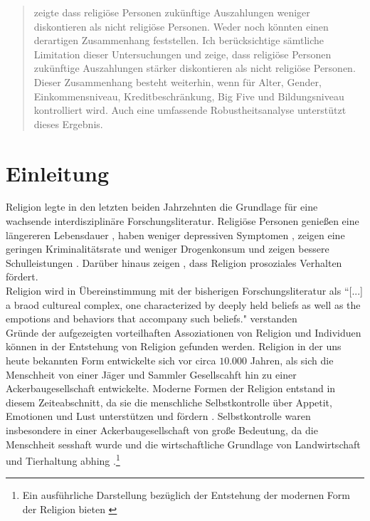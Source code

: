 \documentclass[11pt,a4paper]{article}
\begin{document}

\newpage
\tableofcontents
\listoffigures
\listoftables
\newpage
\begin{abstract}
\textcite{carter2012religious} zeigte dass religiöse Personen zukünftige Auszahlungen weniger diskontieren als nicht religiöse Personen. Weder \textcite{benjamin2013religious} noch \textcite{thornton2015divine} könnten einen derartigen Zusammenhang feststellen. Ich berücksichtige sämtliche Limitation dieser Untersuchungen und zeige, dass religiöse Personen zukünftige Auszahlungen stärker diskontieren als nicht religiöse Personen. Dieser Zusammenhang besteht weiterhin, wenn für Alter, Gender, Einkommensniveau, Kreditbeschränkung, Big Five und Bildungsniveau kontrolliert wird. Auch eine umfassende Robustheitsanalyse unterstützt dieses Ergebnis. 
\end{abstract}

\section{Einleitung}

Religion legte in den letzten beiden Jahrzehnten die Grundlage für eine  wachsende interdisziplinäre Forschungsliteratur. Religiöse Personen genießen eine längereren Lebensdauer \parencite{mccullough2000religious}, haben weniger depressiven Symptomen \parencite{smith2003religiousness}, zeigen eine geringen  Kriminalitätsrate und weniger Drogenkonsum \parencite{baier2001if} und zeigen bessere Schulleistungen \parencite{jeynes2002meta}. Darüber hinaus zeigen \textcite{norenzayan2008origin}, dass Religion prosoziales Verhalten fördert.\\
Religion wird in Übereinstimmung mit der bisherigen Forschungsliteratur als  “[...] a braod cultureal complex, one characterized by deeply held beliefs as well as the empotions and behaviors that accompany such beliefs." verstanden \parencite{mccullough2013religion}\\

Gründe der aufgezeigten vorteilhaften Assoziationen von Religion und Individuen können in der Entstehung von Religion gefunden werden. Religion in der uns heute bekannten Form entwickelte sich vor circa $10.000$ Jahren, als sich die Menschheit von einer Jäger und Sammler Gesellscahft hin zu einer Ackerbaugesellschaft entwickelte\parencite{wright2010evolution}. Moderne Formen der Religion entstand in diesem Zeiteabschnitt, da sie die menschliche Selbstkontrolle über Appetit, Emotionen und Lust unterstützen und fördern \parencite{mccullough2013religion}. Selbstkontrolle waren insbesondere in einer Ackerbaugesellschaft von große Bedeutung, da die Menschheit sesshaft wurde und die wirtschaftliche Grundlage von Landwirtschaft und Tierhaltung abhing \parencite{mccullough2013religion}.\footnote{Ein ausführliche Darstellung bezüglich der Entstehung der modernen Form der Religion bieten \textcite{mccullough2013religion}}\\
\end{document}

